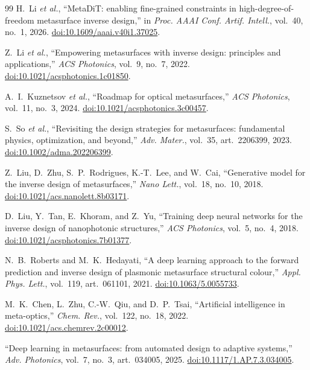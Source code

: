 \documentclass[pdflatex,oneside,sn-mathphys-num]{sn-jnl}
\theoremstyle{thmstyleone}
\theoremstyle{thmstyletwo}
\theoremstyle{thmstylethree}
\begin{document}
\begingroup\small
\begin{thebibliography}{99} H.~Li \emph{et al.}, ``MetaDiT: enabling fine-grained constraints in
high-degree-of-freedom metasurface inverse design,'' in \emph{Proc. AAAI Conf. Artif.
Intell.}, vol.~40, no.~1, 2026. \href{https://doi.org/10.1609/aaai.v40i1.37025}{doi:10.1609/aaai.v40i1.37025}.

 Z.~Li \emph{et al.}, ``Empowering metasurfaces with inverse design:
principles and applications,'' \emph{ACS Photonics}, vol.~9, no.~7, 
2022. \href{https://doi.org/10.1021/acsphotonics.1c01850}{doi:10.1021/acsphotonics.1c01850}.

 A.~I.~Kuznetsov \emph{et al.}, ``Roadmap for optical metasurfaces,''
\emph{ACS Photonics}, vol.~11, no.~3, 2024.
\href{https://doi.org/10.1021/acsphotonics.3c00457}{doi:10.1021/acsphotonics.3c00457}.

 S.~So \emph{et al.}, ``Revisiting the design strategies for
metasurfaces: fundamental physics, optimization, and beyond,'' \emph{Adv. Mater.},
vol.~35, art.~2206399, 2023. \href{https://doi.org/10.1002/adma.202206399}{doi:10.1002/adma.202206399}.

 Z.~Liu, D.~Zhu, S.~P.~Rodrigues, K.-T.~Lee, and W.~Cai,
``Generative model for the inverse design of metasurfaces,'' \emph{Nano Lett.},
vol.~18, no.~10, 2018. \href{https://doi.org/10.1021/acs.nanolett.8b03171}{doi:10.1021/acs.nanolett.8b03171}.

 D.~Liu, Y.~Tan, E.~Khoram, and Z.~Yu, ``Training deep neural networks
for the inverse design of nanophotonic structures,'' \emph{ACS Photonics}, vol.~5,
no.~4, 2018. \href{https://doi.org/10.1021/acsphotonics.7b01377}{doi:10.1021/acsphotonics.7b01377}.

 N.~B.~Roberts and M.~K.~Hedayati, ``A deep learning approach
to the forward prediction and inverse design of plasmonic metasurface structural
colour,'' \emph{Appl. Phys. Lett.}, vol.~119, art.~061101, 2021.
\href{https://doi.org/10.1063/5.0055733}{doi:10.1063/5.0055733}.

 M.~K.~Chen, L.~Zhu, C.-W.~Qiu, and D.~P.~Tsai, ``Artificial
intelligence in meta-optics,'' \emph{Chem. Rev.}, vol.~122, no.~18,
2022. \href{https://doi.org/10.1021/acs.chemrev.2c00012}{doi:10.1021/acs.chemrev.2c00012}.

 ``Deep learning in metasurfaces: from automated design to
adaptive systems,'' \emph{Adv. Photonics}, vol.~7, no.~3, art.~034005, 2025.
\href{https://doi.org/10.1117/1.AP.7.3.034005}{doi:10.1117/1.AP.7.3.034005}.


\end{thebibliography}
\end{document}

